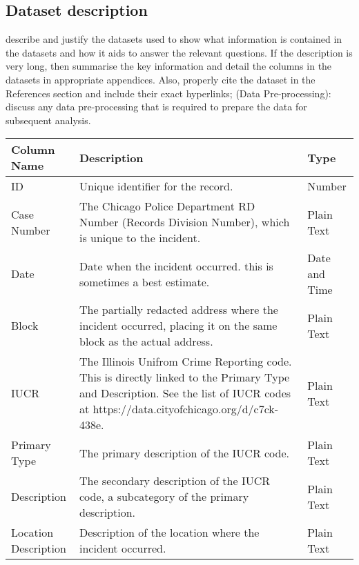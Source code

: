 
\subsection{Dataset description}\label{subsection}
describe and justify the datasets used to show what information is contained in the datasets and how it aids to answer the relevant questions. If the description is very long, then summarise the key information and detail the columns in the datasets in appropriate appendices. Also, properly cite the dataset in the References section and include their exact hyperlinks; \newline
(Data Pre-processing): discuss any data pre-processing that is required to prepare the data for subsequent analysis. 

\begin{center}
\begin{longtable}{|m{6em}|m{18em}|m{7em}|}
    \hline
        Column Name & 
        Description & 
        Type\\
    \hline
        ID & 
        Unique identifier for the record. & 
        Number\\
    \hline
        Case Number & 
        The Chicago Police Department RD Number (Records Division Number),
        which is unique to the incident. & 
        Plain Text\\
    \hline
        Date & 
        Date when the incident occurred. this is sometimes a best estimate. & 
        Date and Time\\
    \hline
        Block & 
        The partially redacted address where the incident occurred, 
        placing it on the same block as the actual address. & 
        Plain Text\\
    \hline
        IUCR & 
        The Illinois Unifrom Crime Reporting code. This is directly linked 
        to the Primary Type and Description. See the list of IUCR codes 
        at https://data.cityofchicago.org/d/c7ck-438e. & 
        Plain Text\\
    \hline
        Primary Type & 
        The primary description of the IUCR code. & 
        Plain Text\\
    \hline
        Description & 
        The secondary description of the IUCR code, 
        a subcategory of the primary description. & 
        Plain Text\\
    \hline
        Location Description & 
        Description of the location where the incident occurred. & 
        Plain Text\\
    \hline

\end{longtable}
\end{center}
